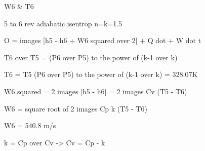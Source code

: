 W6 & T6

5 to 6 rev adiabatic isentrop n=k=1.5

O = images [h5 - h6 + W6 squared over 2] + Q dot + W dot t

T6 over T5 = (P6 over P5) to the power of (k-1 over k)

T6 = T5 (P6 over P5) to the power of (k-1 over k) = 328.07K

W6 squared = 2 images [h5 - h6] = 2 images Cv (T5 - T6)

W6 = square root of 2 images Cp k (T5 - T6)

W6 = 540.8 m/s

k = Cp over Cv -> Cv = Cp - k